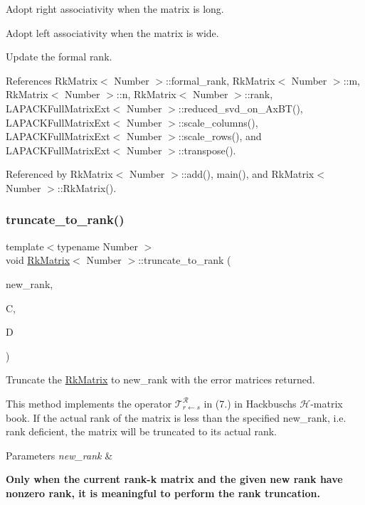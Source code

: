 Adopt right associativity when the matrix is long.

Adopt left associativity when the matrix is wide.

Update the formal rank.

References Rk\+Matrix$<$ Number $>$\+::formal\+\_\+rank, Rk\+Matrix$<$ Number $>$\+::m, Rk\+Matrix$<$ Number $>$\+::n, Rk\+Matrix$<$ Number $>$\+::rank, L\+A\+P\+A\+C\+K\+Full\+Matrix\+Ext$<$ Number $>$\+::reduced\+\_\+svd\+\_\+on\+\_\+\+Ax\+B\+T(), L\+A\+P\+A\+C\+K\+Full\+Matrix\+Ext$<$ Number $>$\+::scale\+\_\+columns(), L\+A\+P\+A\+C\+K\+Full\+Matrix\+Ext$<$ Number $>$\+::scale\+\_\+rows(), and L\+A\+P\+A\+C\+K\+Full\+Matrix\+Ext$<$ Number $>$\+::transpose().



Referenced by Rk\+Matrix$<$ Number $>$\+::add(), main(), and Rk\+Matrix$<$ Number $>$\+::\+Rk\+Matrix().

\mbox{\label{classRkMatrix_adbaf1dad03ca2fe0ede5bab2315d8859}} 
\subsubsection{\texorpdfstring{truncate\+\_\+to\+\_\+rank()}{truncate\_to\_rank()}\hspace{0.1cm}{\footnotesize\ttfamily [2/2]}}
{\footnotesize\ttfamily template$<$typename Number $>$ \\
void \hyperlink{classRkMatrix}{Rk\+Matrix}$<$ Number $>$\+::truncate\+\_\+to\+\_\+rank (\begin{DoxyParamCaption}\item[{\hyperlink{classRkMatrix_add060bfc3a4cc77f858c3d6dd58cadd5}{size\+\_\+type}}]{new\+\_\+rank,  }\item[{\hyperlink{classLAPACKFullMatrixExt}{L\+A\+P\+A\+C\+K\+Full\+Matrix\+Ext}$<$ Number $>$ \&}]{C,  }\item[{\hyperlink{classLAPACKFullMatrixExt}{L\+A\+P\+A\+C\+K\+Full\+Matrix\+Ext}$<$ Number $>$ \&}]{D }\end{DoxyParamCaption})}

Truncate the \hyperlink{classRkMatrix}{Rk\+Matrix} to {\ttfamily new\+\_\+rank} with the error matrices returned.


\begin{DoxyDescription}
\item[Note ]This method implements the operator $\mathcal{T}_{r \leftarrow s}^{\mathcal{R}}$ in (7.) in Hackbusch\textquotesingle{}s $\mathcal{H}$-\/matrix book. If the actual rank of the matrix is less than the specified {\ttfamily new\+\_\+rank}, i.\+e. rank deficient, the matrix will be truncated to its actual rank. 
\end{DoxyDescription}
\begin{DoxyParams}{Parameters}
{\em new\+\_\+rank} & \\
\hline
\end{DoxyParams}
{\bfseries Only when the current rank-\/k matrix and the given new rank have nonzero rank, it is meaningful to perform the rank truncation.}

